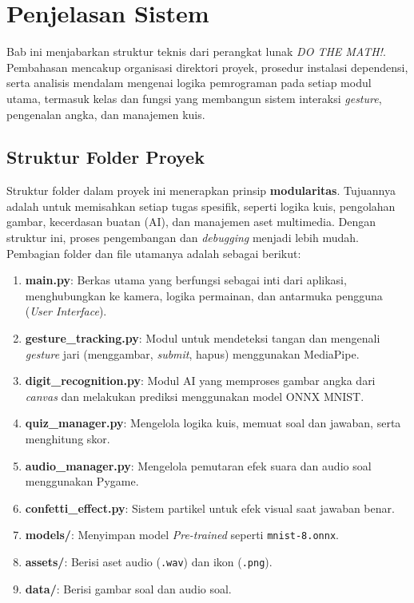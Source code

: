 \section{Penjelasan Sistem}

Bab ini menjabarkan struktur teknis dari perangkat lunak \textit{DO THE MATH!}. Pembahasan mencakup organisasi direktori proyek, prosedur instalasi dependensi, serta analisis mendalam mengenai logika pemrograman pada setiap modul utama, termasuk kelas dan fungsi yang membangun sistem interaksi \textit{gesture}, pengenalan angka, dan manajemen kuis.

\subsection{Struktur Folder Proyek}
Struktur folder dalam proyek ini menerapkan prinsip \textbf{modularitas}. Tujuannya adalah untuk memisahkan setiap tugas spesifik, seperti logika kuis, pengolahan gambar, kecerdasan buatan (AI), dan manajemen aset multimedia. Dengan struktur ini, proses pengembangan dan \textit{debugging} menjadi lebih mudah. Pembagian folder dan file utamanya adalah sebagai berikut:

\begin{enumerate}
    \item \textbf{main.py}: Berkas utama yang berfungsi sebagai inti dari aplikasi, menghubungkan ke kamera, logika permainan, dan antarmuka pengguna (\textit{User Interface}).
    \item \textbf{gesture\_tracking.py}: Modul untuk mendeteksi tangan dan mengenali \textit{gesture} jari (menggambar, \textit{submit}, hapus) menggunakan MediaPipe.
    \item \textbf{digit\_recognition.py}: Modul AI yang memproses gambar angka dari \textit{canvas} dan melakukan prediksi menggunakan model ONNX MNIST.
    \item \textbf{quiz\_manager.py}: Mengelola logika kuis, memuat soal dan jawaban, serta menghitung skor.
    \item \textbf{audio\_manager.py}: Mengelola pemutaran efek suara dan audio soal menggunakan Pygame.
    \item \textbf{confetti\_effect.py}: Sistem partikel untuk efek visual saat jawaban benar.
    \item \textbf{models/}: Menyimpan model \textit{Pre-trained} seperti \texttt{mnist-8.onnx}.
    \item \textbf{assets/}: Berisi aset audio (\texttt{.wav}) dan ikon (\texttt{.png}).
    \item \textbf{data/}: Berisi gambar soal dan audio soal.
\end{enumerate}

